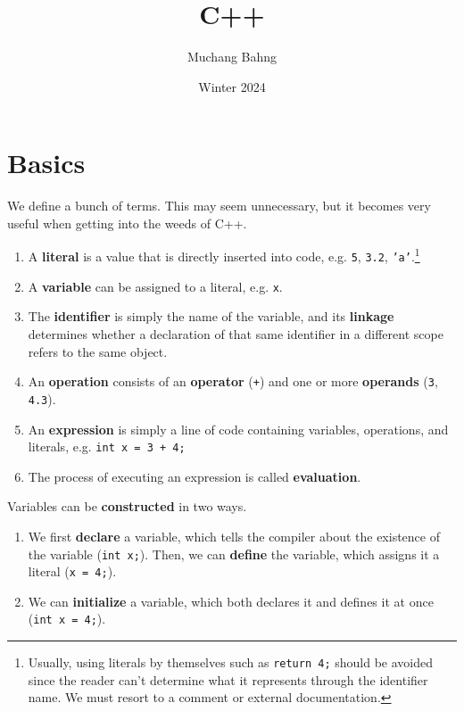 \documentclass{article}
\begin{document}
\title{C++}
\author{Muchang Bahng}
\date{Winter 2024}

\maketitle
\tableofcontents
\pagebreak

\section{Basics} 

    We define a bunch of terms. This may seem unnecessary, but it becomes very useful when getting into the weeds of C++. 

    \begin{definition}[Variables]
      \begin{enumerate}
        \item A \textbf{literal} is a value that is directly inserted into code, e.g. \texttt{5}, \texttt{3.2}, \texttt{'a'}.\footnote{Usually, using literals by themselves such as \texttt{return 4;} should be avoided since the reader can't determine what it represents through the identifier name. We must resort to a comment or external documentation. } 
        \item A \textbf{variable} can be assigned to a literal, e.g. \texttt{x}. 
        \item The \textbf{identifier} is simply the name of the variable, and its \textbf{linkage} determines whether a declaration of that same identifier in a different scope refers to the same object. 
        \item An \textbf{operation} consists of an \textbf{operator} (\texttt{+}) and one or more \textbf{operands} (\texttt{3}, \texttt{4.3}).  
        \item An \textbf{expression} is simply a line of code containing variables, operations, and literals, e.g. \texttt{int x = 3 + 4;} 
        \item The process of executing an expression is called \textbf{evaluation}. 
      \end{enumerate}

      Variables can be \textbf{constructed} in two ways. 
      \begin{enumerate}
        \item We first \textbf{declare} a variable, which tells the compiler about the existence of the variable (\texttt{int x;}). Then, we can \textbf{define} the variable, which assigns it a literal (\texttt{x = 4;}). 
        \item We can \textbf{initialize} a variable, which both declares it and defines it at once (\texttt{int x = 4;}).
      \end{enumerate}
    \end{definition}
\end{document}
